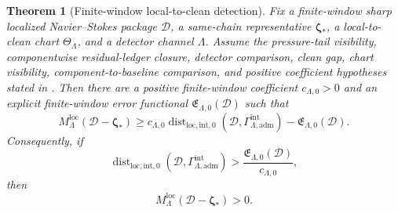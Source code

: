 \documentclass[10pt,a4paper]{amsart}
\newtheorem{theorem}{Theorem}
\newcommand{\Dist}{\operatorname{dist}}
\newcommand{\adm}{\mathrm{adm}}
\newcommand{\bzeta}{\boldsymbol\zeta}
\newcommand{\calD}{\mathcal D}
\newcommand{\intg}{\mathrm{int}}
\newcommand{\loc}{\mathrm{loc}}
\begin{document}
\begin{theorem}[Finite-window local-to-clean detection]\label{thm:journal-main}
Fix a finite-window sharp localized Navier--Stokes package \(\calD\), a same-chain representative \(\bzeta_*\), a local-to-clean chart \(\Theta_\Lambda\), and a detector channel \(\Lambda\).  Assume the pressure-tail visibility, componentwise residual-ledger closure, detector comparison, clean gap, chart visibility, component-to-baseline comparison, and positive coefficient hypotheses stated in .  Then there are a positive finite-window coefficient \(c_{\Lambda,0}>0\) and an explicit finite-window error functional \(\mathfrak E_{\Lambda,0}(\calD)\) such that
\begin{equation}\label{eq:journal-main}
        M_{\Lambda}^{\loc}(\calD-\bzeta_*)
        \ge
        c_{\Lambda,0}
        \Dist_{\loc,\intg,0}(\calD,\Gamma^{\intg}_{\Lambda,\adm})
        -
        \mathfrak E_{\Lambda,0}(\calD).
\end{equation}
Consequently, if
\begin{equation}\label{eq:positive-detection-threshold}
        \Dist_{\loc,\intg,0}(\calD,\Gamma^{\intg}_{\Lambda,\adm})
        >
        \frac{\mathfrak E_{\Lambda,0}(\calD)}{c_{\Lambda,0}},
\end{equation}
then
\[
        M_{\Lambda}^{\loc}(\calD-\bzeta_*)>0.
\]
\end{theorem}
\end{document}
